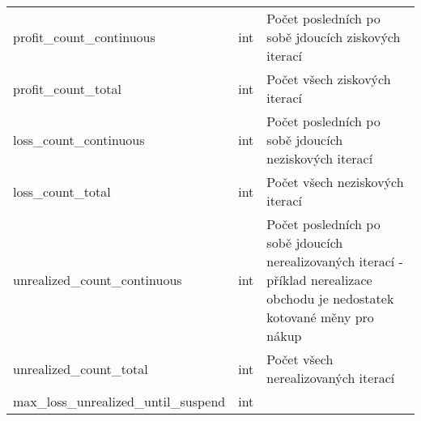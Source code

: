\begin{center}
\begin{longtable}[h]{|l|C{4cm}|p{4cm}|}
        profit\_count\_continuous             & int                                                                                                                                                              & Počet posledních po sobě jdoucích ziskových iterací                                                                               \\
        profit\_count\_total                  & int                                                                                                                                                              & Počet všech ziskových iterací                                                                                                     \\
        loss\_count\_continuous               & int                                                                                                                                                              & Počet posledních po sobě jdoucích neziskových iterací                                                                             \\
        loss\_count\_total                    & int                                                                                                                                                              & Počet všech neziskových iterací                                                                                                   \\
        unrealized\_count\_continuous         & int                                                                                                                                                              & Počet posledních po sobě jdoucích nerealizovaných iterací - příklad nerealizace obchodu je nedostatek kotované měny pro nákup     \\
        unrealized\_count\_total              & int                                                                                                                                                              & Počet všech nerealizovaných iterací                                                                                               \\
        max\_loss\_unrealized\_until\_suspend & int                                                                                                                                                              &                                                                                                                                   \\

\end{longtable}
\end{center}
